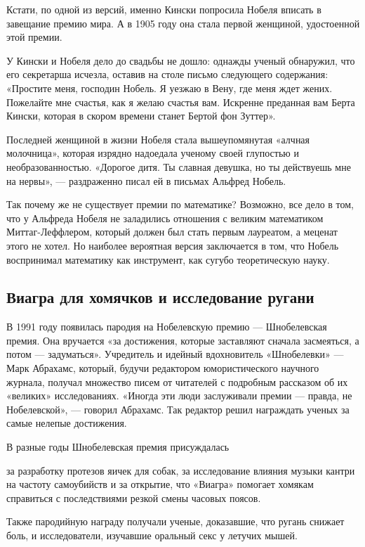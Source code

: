 \begin{fancyquotes}
    Кстати, по одной из версий, именно Кински попросила Нобеля вписать в завещание премию мира. А в 1905 году она стала первой женщиной, удостоенной этой премии.
\end{fancyquotes}

У Кински и Нобеля дело до свадьбы не дошло: однажды ученый обнаружил, что его секретарша исчезла, оставив на столе письмо следующего содержания: «Простите меня, господин Нобель. Я уезжаю в Вену, где меня ждет жених. Пожелайте мне счастья, как я желаю счастья вам. Искренне преданная вам Берта Кински, которая в скором времени станет Бертой фон Зуттер».

Последней женщиной в жизни Нобеля стала вышеупомянутая «алчная молочница», которая изрядно надоедала ученому своей глупостью и необразованностью. «Дорогое дитя. Ты славная девушка, но ты действуешь мне на нервы», — раздраженно писал ей в письмах Альфред Нобель.

Так почему же не существует премии по математике? Возможно, все дело в том, что у Альфреда Нобеля не заладились отношения с великим математиком Миттаг-Леффлером, который должен был стать первым лауреатом, а меценат этого не хотел. Но наиболее вероятная версия заключается в том, что Нобель воспринимал математику как инструмент, как сугубо теоретическую науку.

\subsection{Виагра для хомячков и исследование ругани}

В 1991 году появилась пародия на Нобелевскую премию — Шнобелевская премия. Она вручается «за достижения, которые заставляют сначала засмеяться, а потом — задуматься». Учредитель и идейный вдохновитель «Шнобелевки» — Марк Абрахамс, который, будучи редактором юмористического научного журнала, получал множество писем от читателей с подробным рассказом об их «великих» исследованиях. «Иногда эти люди заслуживали премии — правда, не Нобелевской», — говорил Абрахамс. Так редактор решил награждать ученых за самые нелепые достижения.

В разные годы Шнобелевская премия присуждалась

за разработку протезов яичек для собак, за исследование влияния музыки кантри на частоту самоубийств и за открытие, что «Виагра» помогает хомякам справиться с последствиями резкой смены часовых поясов.

Также пародийную награду получали ученые, доказавшие, что ругань снижает боль, и исследователи, изучавшие оральный секс у летучих мышей.

